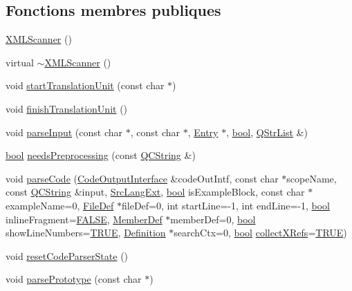 \subsection*{Fonctions membres publiques}
\begin{DoxyCompactItemize}
\item 
\hyperlink{class_x_m_l_scanner_a3daf63d93bfcf94a3379fb2a498793c5}{X\+M\+L\+Scanner} ()
\item 
virtual \hyperlink{class_x_m_l_scanner_a6f99f7a17ce181d584c5dcd9fdc51752}{$\sim$\+X\+M\+L\+Scanner} ()
\item 
void \hyperlink{class_x_m_l_scanner_a105515420268054f9ff54bd60793cfbb}{start\+Translation\+Unit} (const char $\ast$)
\item 
void \hyperlink{class_x_m_l_scanner_a00b3082e888d6bd670fdc31e52b79606}{finish\+Translation\+Unit} ()
\item 
void \hyperlink{class_x_m_l_scanner_ad7b6e344f24e73a8757937a806b5931a}{parse\+Input} (const char $\ast$, const char $\ast$, \hyperlink{class_entry}{Entry} $\ast$, \hyperlink{qglobal_8h_a1062901a7428fdd9c7f180f5e01ea056}{bool}, \hyperlink{class_q_str_list}{Q\+Str\+List} \&)
\item 
\hyperlink{qglobal_8h_a1062901a7428fdd9c7f180f5e01ea056}{bool} \hyperlink{class_x_m_l_scanner_aee7d6327a9e55cd3b965a21f707ed0a5}{needs\+Preprocessing} (const \hyperlink{class_q_c_string}{Q\+C\+String} \&)
\item 
void \hyperlink{class_x_m_l_scanner_a63895d17bafedb76a06399c80eecd840}{parse\+Code} (\hyperlink{class_code_output_interface}{Code\+Output\+Interface} \&code\+Out\+Intf, const char $\ast$scope\+Name, const \hyperlink{class_q_c_string}{Q\+C\+String} \&input, \hyperlink{types_8h_a9974623ce72fc23df5d64426b9178bf2}{Src\+Lang\+Ext}, \hyperlink{qglobal_8h_a1062901a7428fdd9c7f180f5e01ea056}{bool} is\+Example\+Block, const char $\ast$example\+Name=0, \hyperlink{class_file_def}{File\+Def} $\ast$file\+Def=0, int start\+Line=-\/1, int end\+Line=-\/1, \hyperlink{qglobal_8h_a1062901a7428fdd9c7f180f5e01ea056}{bool} inline\+Fragment=\hyperlink{qglobal_8h_a10e004b6916e78ff4ea8379be80b80cc}{F\+A\+L\+S\+E}, \hyperlink{class_member_def}{Member\+Def} $\ast$member\+Def=0, \hyperlink{qglobal_8h_a1062901a7428fdd9c7f180f5e01ea056}{bool} show\+Line\+Numbers=\hyperlink{qglobal_8h_a04a6422a52070f0dc478693da640242b}{T\+R\+U\+E}, \hyperlink{class_definition}{Definition} $\ast$search\+Ctx=0, \hyperlink{qglobal_8h_a1062901a7428fdd9c7f180f5e01ea056}{bool} \hyperlink{tclscanner_8cpp_ac23b94d6976d5bb0c9f1885c5a2e7a53}{collect\+X\+Refs}=\hyperlink{qglobal_8h_a04a6422a52070f0dc478693da640242b}{T\+R\+U\+E})
\item 
void \hyperlink{class_x_m_l_scanner_a77da43900e68df9a111eb45546d94fd4}{reset\+Code\+Parser\+State} ()
\item 
void \hyperlink{class_x_m_l_scanner_afee3f3cec27ae00c00b6fcdd78476edb}{parse\+Prototype} (const char $\ast$)
\end{DoxyCompactItemize}



